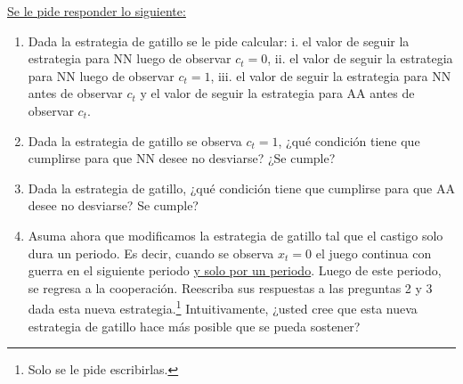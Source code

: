 \documentclass[11pt]{article}
\begin{document}
\underline{Se le pide responder lo siguiente:}
\begin{enumerate}
	\item Dada la estrategia de gatillo se le pide calcular:  i. el valor de seguir la estrategia para NN luego de observar $c_{t}=0$, ii. el valor de seguir la estrategia para NN luego de observar $c_{t}=1$, iii. el valor de seguir la estrategia para NN antes de observar $c_{t}$ y el valor de seguir la estrategia para AA antes de observar $c_{t}$.
	\item Dada la estrategia de gatillo se observa $c_{t} = 1$, ¿qu\'e condici\'on tiene que cumplirse para que NN desee no desviarse? ¿Se cumple?
	\item Dada la estrategia de gatillo, ¿qu\'e condici\'on tiene que cumplirse para que AA desee no desviarse? Se cumple?
	\item Asuma ahora que modificamos la estrategia de gatillo tal que el castigo solo dura un periodo. Es decir, cuando se observa $x_{t} = 0$ el juego continua con guerra en el siguiente periodo \underline{y solo por un periodo}. Luego de este periodo, se regresa a la cooperaci\'on. Reescriba sus respuestas a las preguntas 2 y 3 dada esta nueva estrategia.\footnote{Solo se le pide escribirlas.} Intuitivamente, ¿usted cree que esta nueva estrategia de gatillo hace m\'as posible que se pueda sostener?
\end{enumerate}



\end{document}
